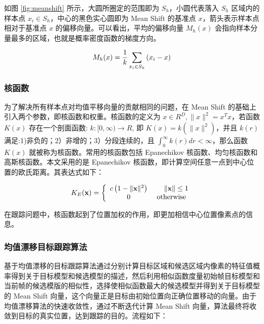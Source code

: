 如图 \ref{fig:meanshift} 所示，大圆所圈定的范围即为 $S_h$，小圆代表落入 $S_h$ 区域内的样本点 $x_i \in S_h$，中心的黑色实心圆即为 Mean Shift 的基准点 $x$，箭头表示样本点相对于基准点 $x$ 的偏移向量。可以看出，平均的偏移向量 $M_h(x)$ 会指向样本分量最多的区域，也就是概率密度函数的梯度方向。
\vspace{0.5cm}

\begin{equation}
M_h(x)=\frac{1}{k} \sum_{x_i \in S_h}\left(x_i-x\right)
\vspace{0.5cm}
\end{equation}

\subsubsection{核函数}
为了解决所有样本点对均值平移向量的贡献相同的问题，在 Mean Shift 的基础上引入两个参数，即核函数和权重。核函数的定义为 $x \in R^D,\|x\|^2=x^T x$，若函数 $K(𝑥)$ 存在一个剖面函数: $k:[0, \infty) \rightarrow R$, 即 $K(x)=k\left(\|x\|^2\right)$，并且 $k(𝑟)$ 满足:1)非负的；2）非增的；3）分段连续的，且 $\int_0^{\infty} k(r) d r<\infty$，那么函数 $K(𝑥)$ 就被称为核函数。常用的核函数包括 Epanechikov 核函数、均匀核函数和高斯核函数。本文采用的是 Epanechikov 核函数，即计算空间任意一点到中心位置的欧氏距离。其表达式如下：
\vspace{0.5cm}

\begin{equation}
K_E(\mathbf{x})=\left\{\begin{array}{cr}
c\left(1-\|\mathbf{x}\|^2\right) & \|\mathbf{x}\| \leq 1 \\
0 & \text { otherwise }
\end{array}\right.
\vspace{0.5cm}
\end{equation}

在跟踪问题中，核函数起到了位置加权的作用，即更加相信中心位置像素点的信息。

\subsubsection{均值漂移目标跟踪算法}

基于均值漂移的目标跟踪算法通过分别计算目标区域和候选区域内像素的特征值概率得到关于目标模型和候选模型的描述，然后利用相似函数度量初始帧目标模型和当前帧的候选模版的相似性，选择使相似函数最大的候选模型并得到关于目标模型的 Mean Shift 向量，这个向量正是目标由初始位置向正确位置移动的向量。由于均值漂移算法的快速收敛性，通过不断迭代计算 Mean Shift 向量，算法最终将收敛到目标的真实位置，达到跟踪的目的。流程如下：

